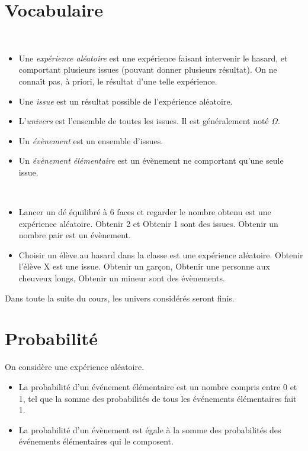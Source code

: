 \section{Vocabulaire}

\begin{definition}~
  \begin{itemize}
    \item Une \emph{expérience aléatoire} est une expérience faisant intervenir le hasard, et comportant plusieurs issues (pouvant donner plusieurs résultat). On ne connaît pas, à priori, le résultat d'une telle expérience.
    \item Une \emph{issue} est un résultat possible de l'expérience aléatoire.
    \item L'\emph{univers} est l'ensemble de toutes les issues. Il est généralement noté $\Omega$.
    \item Un \emph{évènement} est un ensemble d'issues.
    \item Un \emph{évènement élémentaire} est un évènement ne comportant qu'une seule issue.
  \end{itemize}
\end{definition}

\begin{exemple}~
  \begin{itemize}
    \item Lancer un dé équilibré à 6 faces et regarder le nombre obtenu est une expérience aléatoire. \og{}Obtenir 2\fg{} et \og{}Obtenir 1\fg{} sont des issues. \og{}Obtenir un nombre pair\fg{} est un évènement.
    \item Choisir un élève au hasard dans la classe est une expérience aléatoire. \og{}Obtenir l'élève X\fg{} est une issue. \og{}Obtenir un garçon\fg{}, \og{}Obtenir une personne aux cheuveux longs\fg{}, \og{}Obtenir un mineur\fg{} sont des évènements.
  \end{itemize}
\end{exemple}

\begin{remarque}
  Dans toute la suite du cours, les univers considérés seront finis.
\end{remarque}

\section{Probabilité}

\begin{definition} On considère une expérience aléatoire.
  \begin{itemize}
    \item La probabilité d'un événement élémentaire est un nombre compris entre 0 et 1, tel que la somme des probabilités de tous les événements élémentaires fait 1.
    \item La probabilité d'un évènement est égale à la somme des probabilités des événements élémentaires qui le composent.
  \end{itemize}
\end{definition}

